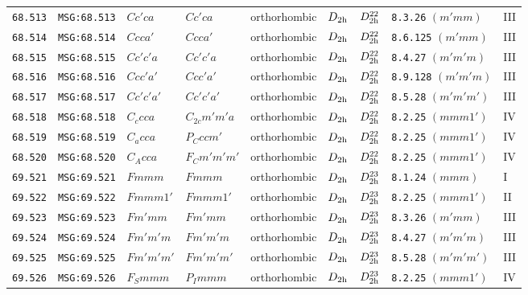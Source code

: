 \documentclass[fleqn,10pt]{jsarticle}
\begin{document}
\begin{center}
\begin{longtable}{lllllllll}
\texttt{68.513} & \texttt{MSG:68.513} & $Cc'ca$ & $Cc'ca$ & orthorhombic & $D_{\rm 2h}$ & $D_{\rm 2h}^{22}$ & \texttt{8.3.26} $(m'mm)$ & III \\
\texttt{68.514} & \texttt{MSG:68.514} & $Ccca'$ & $Ccca'$ & orthorhombic & $D_{\rm 2h}$ & $D_{\rm 2h}^{22}$ & \texttt{8.6.125} $(m'mm)$ & III \\
\texttt{68.515} & \texttt{MSG:68.515} & $Cc'c'a$ & $Cc'c'a$ & orthorhombic & $D_{\rm 2h}$ & $D_{\rm 2h}^{22}$ & \texttt{8.4.27} $(m'm'm)$ & III \\
\texttt{68.516} & \texttt{MSG:68.516} & $Ccc'a'$ & $Ccc'a'$ & orthorhombic & $D_{\rm 2h}$ & $D_{\rm 2h}^{22}$ & \texttt{8.9.128} $(m'm'm)$ & III \\
\texttt{68.517} & \texttt{MSG:68.517} & $Cc'c'a'$ & $Cc'c'a'$ & orthorhombic & $D_{\rm 2h}$ & $D_{\rm 2h}^{22}$ & \texttt{8.5.28} $(m'm'm')$ & III \\
\texttt{68.518} & \texttt{MSG:68.518} & $C_{c}cca$ & $C_{2c}m'm'a$ & orthorhombic & $D_{\rm 2h}$ & $D_{\rm 2h}^{22}$ & \texttt{8.2.25} $(mmm1')$ & IV \\
\texttt{68.519} & \texttt{MSG:68.519} & $C_{a}cca$ & $P_{C}ccm'$ & orthorhombic & $D_{\rm 2h}$ & $D_{\rm 2h}^{22}$ & \texttt{8.2.25} $(mmm1')$ & IV \\
\texttt{68.520} & \texttt{MSG:68.520} & $C_{A}cca$ & $F_{C}m'm'm'$ & orthorhombic & $D_{\rm 2h}$ & $D_{\rm 2h}^{22}$ & \texttt{8.2.25} $(mmm1')$ & IV \\ \hline
\texttt{69.521} & \texttt{MSG:69.521} & $Fmmm$ & $Fmmm$ & orthorhombic & $D_{\rm 2h}$ & $D_{\rm 2h}^{23}$ & \texttt{8.1.24} $(mmm)$ & I \\
\texttt{69.522} & \texttt{MSG:69.522} & $Fmmm1'$ & $Fmmm1'$ & orthorhombic & $D_{\rm 2h}$ & $D_{\rm 2h}^{23}$ & \texttt{8.2.25} $(mmm1')$ & II \\
\texttt{69.523} & \texttt{MSG:69.523} & $Fm'mm$ & $Fm'mm$ & orthorhombic & $D_{\rm 2h}$ & $D_{\rm 2h}^{23}$ & \texttt{8.3.26} $(m'mm)$ & III \\
\texttt{69.524} & \texttt{MSG:69.524} & $Fm'm'm$ & $Fm'm'm$ & orthorhombic & $D_{\rm 2h}$ & $D_{\rm 2h}^{23}$ & \texttt{8.4.27} $(m'm'm)$ & III \\
\texttt{69.525} & \texttt{MSG:69.525} & $Fm'm'm'$ & $Fm'm'm'$ & orthorhombic & $D_{\rm 2h}$ & $D_{\rm 2h}^{23}$ & \texttt{8.5.28} $(m'm'm')$ & III \\
\texttt{69.526} & \texttt{MSG:69.526} & $F_{S}mmm$ & $P_{I}mmm$ & orthorhombic & $D_{\rm 2h}$ & $D_{\rm 2h}^{23}$ & \texttt{8.2.25} $(mmm1')$ & IV \\ \hline

\end{longtable}
\end{center}
\end{document}
